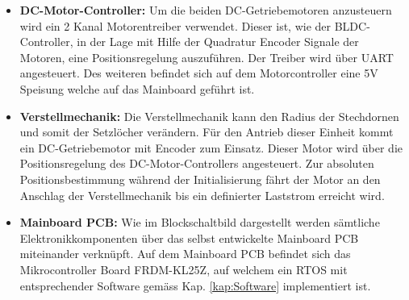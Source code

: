 \begin{itemize}
	\item \textbf{DC-Motor-Controller:} Um die beiden DC-Getriebemotoren anzusteuern wird ein 2 Kanal Motorentreiber verwendet. Dieser ist, wie der BLDC-Controller, in der Lage mit Hilfe der Quadratur Encoder Signale der Motoren, eine Positionsregelung auszuführen. Der Treiber wird über UART angesteuert. Des weiteren befindet sich auf dem Motorcontroller eine 5V Speisung welche auf das Mainboard geführt ist.
	
	\item \textbf{Verstellmechanik:} Die Verstellmechanik kann den Radius der Stechdornen und somit der Setzlöcher verändern. Für den Antrieb dieser Einheit kommt ein DC-Getriebemotor mit Encoder zum Einsatz. Dieser Motor wird über die Positionsregelung des DC-Motor-Controllers angesteuert. Zur absoluten Positionsbestimmung während der Initialisierung fährt der Motor an den Anschlag der Verstellmechanik bis ein definierter Laststrom erreicht wird.
	
	\item \textbf{Mainboard PCB:} Wie im Blockschaltbild dargestellt werden sämtliche Elektronikkomponenten über das selbst entwickelte Mainboard PCB miteinander verknüpft. Auf dem Mainboard PCB befindet sich das Mikrocontroller Board FRDM-KL25Z, auf welchem ein RTOS mit entsprechender Software gemäss Kap. \ref{kap:Software} implementiert ist.
\end{itemize}